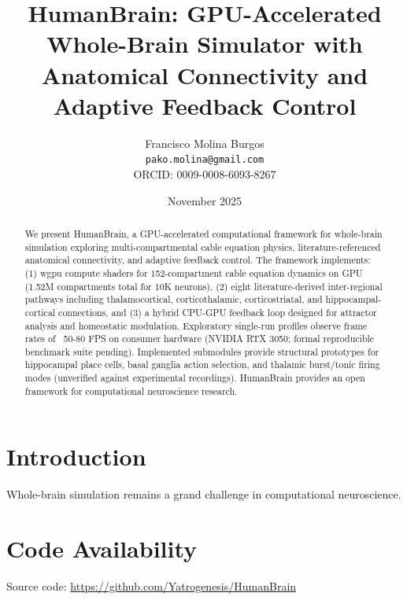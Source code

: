 \documentclass{article}
\title{HumanBrain: GPU-Accelerated Whole-Brain Simulator with Anatomical Connectivity and Adaptive Feedback Control}
\author{
    Francisco Molina Burgos \\
    \texttt{pako.molina@gmail.com} \\
    ORCID: 0009-0008-6093-8267
}
\date{November 2025}
\begin{document}
\maketitle

\begin{abstract}
We present HumanBrain, a GPU-accelerated computational framework for whole-brain simulation exploring multi-compartmental cable equation physics, literature-referenced anatomical connectivity, and adaptive feedback control. The framework implements: (1) wgpu compute shaders for 152-compartment cable equation dynamics on GPU (1.52M compartments total for 10K neurons), (2) eight literature-derived inter-regional pathways including thalamocortical, corticothalamic, corticostriatal, and hippocampal-cortical connections, and (3) a hybrid CPU-GPU feedback loop designed for attractor analysis and homeostatic modulation. Exploratory single-run profiles observe frame rates of ~50-80 FPS on consumer hardware (NVIDIA RTX 3050; formal reproducible benchmark suite pending). Implemented submodules provide structural prototypes for hippocampal place cells, basal ganglia action selection, and thalamic burst/tonic firing modes (unverified against experimental recordings). HumanBrain provides an open framework for computational neuroscience research.
\end{abstract}

\section{Introduction}

Whole-brain simulation remains a grand challenge in computational neuroscience.

\section*{Code Availability}

Source code: \url{https://github.com/Yatrogenesis/HumanBrain}
\end{document}

